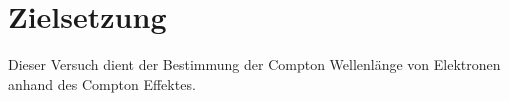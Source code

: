 \section{Zielsetzung}
\label{sec:Zielsetzung}


Dieser Versuch dient der Bestimmung der Compton Wellenlänge von Elektronen anhand des Compton Effektes.